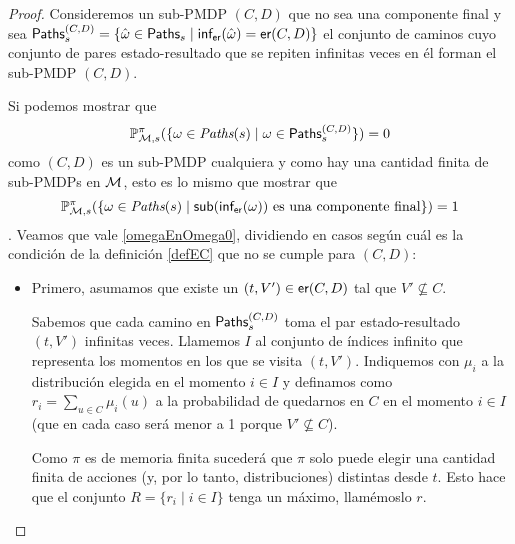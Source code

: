 \begin{proof}
	Consideremos un sub-PMDP $(C,D)$ que no sea una componente final y sea $\textsf{Paths}_s^{(C,D)} = \{\hat{\omega} \in \textsf{Paths}_s \mid \textsf{inf}_\textsf{er}(\hat{\omega}) = \textsf{er}(C, D)\}$ el conjunto de caminos cuyo conjunto de pares estado-resultado que se repiten infinitas veces en él forman el sub-PMDP $(C,D)$.

	Si podemos mostrar que
	\begin{equation}\label{omegaEnOmega0}
		\mathbb{P}^\pi_{\mathcal{M}, s}(\{ \omega \in \textit{Paths}(s) \mid \omega \in \textsf{Paths}_s^{(C,D)}\}) = 0
	\end{equation}
	como $(C,D)$ es un sub-PMDP cualquiera y como hay una cantidad finita de sub-PMDPs en $\mathcal{M}$, esto es lo mismo que mostrar que
	$$\mathbb{P}^\pi_{\mathcal{M}, s}(\{ \omega \in \textit{Paths}(s) \mid \textsf{sub}(\textsf{inf}_\textsf{er}(\omega)) \text{ es una componente final}\}) = 1$$.
	Veamos que vale \ref{omegaEnOmega0}, dividiendo en casos según cuál es la
	condición de la definición \ref{defEC} que no se cumple para $(C,D)$:

	\begin{itemize}
		\item Primero, asumamos que existe un $(t, V') \in \textsf{er}(C,D)$ tal que $V' \nsubseteq
			      C$.



		      Sabemos que cada camino en $\textsf{Paths}_s^{(C,D)}$ toma el par estado-resultado $(t,
			      V')$ infinitas veces. Llamemos $I$ al conjunto de índices infinito que
		      representa los momentos en los que se visita $(t, V')$. Indiquemos con $\mu_i$
		      a la distribución elegida en el momento $i \in I$ y definamos como $r_i =
			      \sum_{u \in C} \mu_i(u)$ a la probabilidad de quedarnos en $C$ en el momento $i
			      \in I$ (que en cada caso será menor a 1 porque $V' \nsubseteq C$). %

		      Como $\pi$ es de memoria finita sucederá que $\pi$ solo puede elegir una
		      cantidad finita de acciones (y, por lo tanto, distribuciones) distintas desde
		      $t$. Esto hace que el conjunto $R = \{r_i \mid i \in I\}$ tenga un máximo,
		      llamémoslo $r$.


\end{itemize}
\end{proof}
